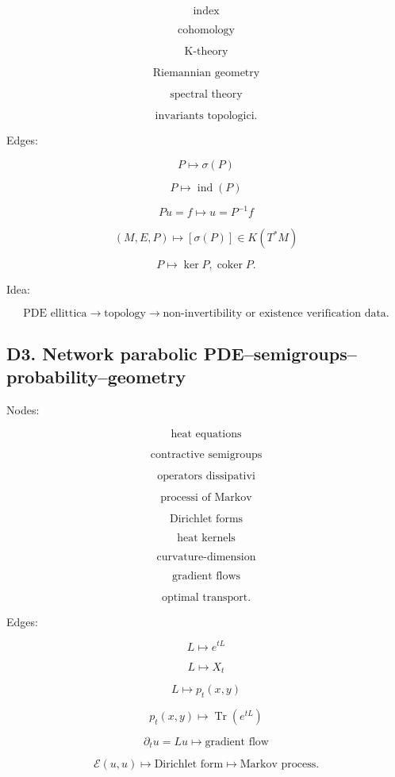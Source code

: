\documentclass[11pt]{article}
\begin{document}
\[
\text{index}
\]

\[
\text{cohomology}
\]

\[
\text{K-theory}
\]

\[
\text{Riemannian geometry}
\]

\[
\text{spectral theory}
\]

\[
\text{invariants topologici}.
\]

Edges:

\[
P\mapsto \sigma(P)
\]

\[
P\mapsto \operatorname{ind}(P)
\]

\[
Pu=f\mapsto u=P^{-1}f
\]

\[
(M,E,P)\mapsto [\sigma(P)]\in K(T^\ast M)
\]

\[
P\mapsto \ker P,\operatorname{coker}P.
\]

Idea:

\[
\text{PDE ellittica}
\to
\text{topology}
\to
\text{non-invertibility or existence verification data}.
\]



\subsection{D3. Network parabolic PDE--semigroups--probability--geometry}

Nodes:

\[
\text{heat equations}
\]

\[
\text{contractive semigroups}
\]

\[
\text{operators dissipativi}
\]

\[
\text{processi of Markov}
\]

\[
\text{Dirichlet forms}
\]

\[
\text{heat kernels}
\]

\[
\text{curvature-dimension}
\]

\[
\text{gradient flows}
\]

\[
\text{optimal transport}.
\]

Edges:

\[
L\mapsto e^{tL}
\]

\[
L\mapsto X_t
\]

\[
L\mapsto p_t(x,y)
\]

\[
p_t(x,y)\mapsto \operatorname{Tr}(e^{tL})
\]

\[
\partial_t u=Lu\mapsto \text{gradient flow}
\]

\[
\mathcal E(u,u)\mapsto \text{Dirichlet form}\mapsto \text{Markov process}.
\]
\end{document}
